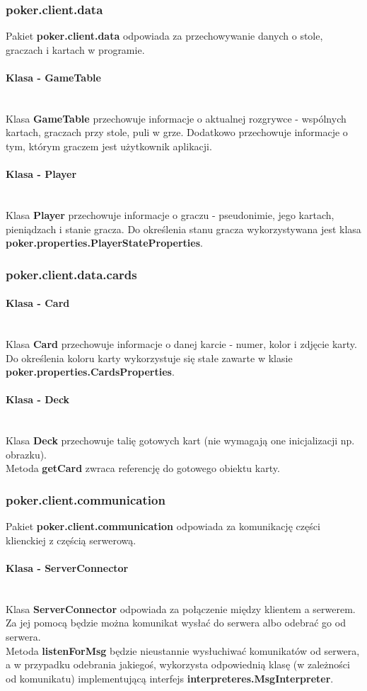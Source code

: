 \documentclass{article}
\newcommand{\mparagraph}[1]{\paragraph{#1}\mbox{}\vspace{2mm}\\}
\begin{document}
        \subsubsection{poker.client.data}
            Pakiet \textbf{poker.client.data} odpowiada za przechowywanie danych o stole, graczach i kartach w programie.
            
            \mparagraph{Klasa - GameTable}
                Klasa \textbf{GameTable} przechowuje informacje o aktualnej rozgrywce - wspólnych kartach, graczach przy stole, puli w grze. Dodatkowo przechowuje informacje o tym, którym graczem jest użytkownik aplikacji.
            
            \mparagraph{Klasa - Player}
                Klasa \textbf{Player} przechowuje informacje o graczu - pseudonimie, jego kartach, pieniądzach i stanie gracza.
                Do określenia stanu gracza wykorzystywana jest klasa \textbf{poker.properties.PlayerStateProperties}.
            
        \subsubsection{poker.client.data.cards}
        
            \mparagraph{Klasa - Card}
                Klasa \textbf{Card} przechowuje informacje o danej karcie - numer, kolor i zdjęcie karty.
                Do określenia koloru karty wykorzystuje się stałe zawarte w klasie \textbf{poker.properties.CardsProperties}.
            
            \mparagraph{Klasa - Deck}
                Klasa \textbf{Deck} przechowuje talię gotowych kart (nie wymagają one inicjalizacji np. obrazku).
                \\
                Metoda \textbf{getCard} zwraca referencję do gotowego obiektu karty.
            
        \subsubsection{poker.client.communication}
            Pakiet \textbf{poker.client.communication} odpowiada za komunikację części klienckiej z częścią serwerową.
            
            \mparagraph{Klasa - ServerConnector}
                Klasa \textbf{ServerConnector} odpowiada za połączenie między klientem a serwerem.
                Za jej pomocą będzie można komunikat wysłać do serwera albo odebrać go od serwera.
                \\
                Metoda \textbf{listenForMsg} będzie nieustannie wysłuchiwać komunikatów od serwera, a w przypadku odebrania jakiegoś, wykorzysta odpowiednią klasę (w zależności od komunikatu) implementującą interfejs \textbf{interpreteres.MsgInterpreter}.
            
\end{document}
